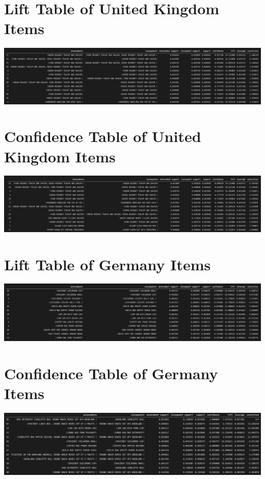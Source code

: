 \documentclass[a4paper,10pt]{article}
\begin{document}
\begin{appendices}
	\section{Lift Table of United Kingdom Items}
	\label{appendix:uklift}
	\includegraphics[scale=0.2]{uklift}
	
	\section{Confidence Table of United Kingdom Items}
	\label{appendix:ukconf}
	\includegraphics[scale=0.2]{ukconf}
	
	\section{Lift Table of Germany Items}
	\label{appendix:germanylift}
	\includegraphics[scale=0.2]{germanylift}
	
	\section{Confidence Table of Germany Items}
	\label{appendix:germanyconf}
	\includegraphics[scale=0.2]{germanyconf}
	

\end{appendices}
\end{document}
